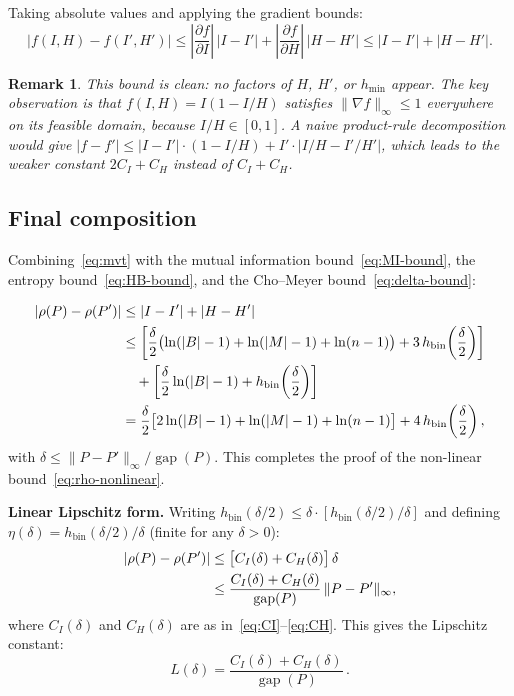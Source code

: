 \documentclass[11pt,a4paper]{article}
\newtheorem{remark}[theorem]{Remark}
\DeclareMathOperator{\gap}{gap}
\begin{document}
Taking absolute values and applying the gradient bounds:
\begin{equation}\label{eq:mvt}
  |f(I,H) - f(I',H')|
  \le \left|\frac{\partial f}{\partial I}\right|\,|I - I'|
  + \left|\frac{\partial f}{\partial H}\right|\,|H - H'|
  \le |I - I'| + |H - H'|.
\end{equation}

\begin{remark}
This bound is clean: no factors of $H$, $H'$, or $h_{\min}$ appear.
The key observation is that $f(I,H) = I(1-I/H)$ satisfies
$\|\nabla f\|_\infty \le 1$ everywhere on its feasible domain,
because $I/H \in [0,1]$.  A naive product-rule decomposition would
give $|f - f'| \le |I - I'| \cdot (1 - I/H) + I' \cdot |I/H - I'/H'|$,
which leads to the weaker constant $2C_I + C_H$ instead of $C_I + C_H$.
\end{remark}

\subsection{Final composition}

Combining~\eqref{eq:mvt} with the mutual information
bound~\eqref{eq:MI-bound}, the entropy bound~\eqref{eq:HB-bound},
and the Cho--Meyer bound~\eqref{eq:delta-bound}:

\begin{align}
  |\rho(P) - \rho(P')|
  &\le |I - I'| + |H - H'| \notag\\
  &\le \left[\frac{\delta}{2}\bigl(\ln(|B|-1) + \ln(|M|-1) + \ln(n-1)\bigr)
       + 3\,h_{\mathrm{bin}}\!\left(\frac{\delta}{2}\right)\right] \notag\\
  &\quad + \left[\frac{\delta}{2}\ln(|B|-1)
       + h_{\mathrm{bin}}\!\left(\frac{\delta}{2}\right)\right] \notag\\
  &= \frac{\delta}{2}\bigl[2\ln(|B|-1) + \ln(|M|-1) + \ln(n-1)\bigr]
     + 4\,h_{\mathrm{bin}}\!\left(\frac{\delta}{2}\right),
     \label{eq:rho-bound-nonlinear}
\end{align}
with $\delta \le \|P - P'\|_\infty / \gap(P)$.
This completes the proof of the non-linear bound~\eqref{eq:rho-nonlinear}.

\medskip
\textbf{Linear Lipschitz form.}  Writing
$h_{\mathrm{bin}}(\delta/2) \le \delta \cdot [h_{\mathrm{bin}}(\delta/2)/\delta]$
and defining $\eta(\delta) = h_{\mathrm{bin}}(\delta/2)/\delta$ (finite for
any $\delta > 0$):
\begin{align}
  |\rho(P) - \rho(P')|
  &\le \bigl[C_I(\delta) + C_H(\delta)\bigr]\,\delta \notag\\
  &\le \frac{C_I(\delta) + C_H(\delta)}{\gap(P)}\,\|P - P'\|_\infty,
  \label{eq:rho-bound-linear}
\end{align}
where $C_I(\delta)$ and $C_H(\delta)$ are as in~\eqref{eq:CI}--\eqref{eq:CH}.
This gives the Lipschitz constant:
\begin{equation}\label{eq:L-final}
  \boxed{L(\delta) = \frac{C_I(\delta) + C_H(\delta)}{\gap(P)}\,.}
\end{equation}
\end{document}
